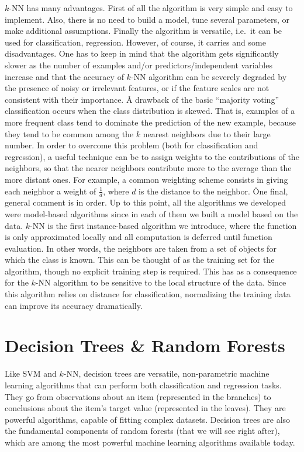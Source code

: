 
$k$-NN has many advantages. First of all the algorithm is very simple and easy to implement. Also, there is no need
to build a model, tune several parameters, or make additional assumptions. Finally the algorithm is versatile, i.e.\
it can be used for classification, regression. However, of course, it carries and some disadvantages. One has to
keep in mind that the algorithm gets significantly slower as the number of examples and/or predictors/independent
variables increase and that the accuracy of $k$-NN algorithm can be severely degraded by the presence of noisy or
irrelevant features, or if the feature scales are not consistent with their importance. \v

A drawback of the basic ``majority voting'' classification occurs when the class distribution is skewed. That is,
examples of a more frequent class tend to dominate the prediction of the new example, because they tend to be common
among the $k$ nearest neighbors due to their large number. In order to overcome this problem (both for classification
and regression), a useful technique can be to assign weights to the contributions of the neighbors, so that the
nearer neighbors contribute more to the average than the more distant ones. For example, a common weighting scheme
consists in giving each neighbor a weight of $\frac{1}{d}$, where $d$ is the distance to the neighbor. \v

One final, general comment is in order. Up to this point, all the algorithms we developed were model-based algorithms
since in each of them we built a model based on the data. $k$-NN is the first instance-based algorithm we introduce,
where the function is only approximated locally and all computation is deferred until function evaluation. In other
words, the neighbors are taken from a set of objects for which the class is known. This can be thought of as the
training set for the algorithm, though no explicit training step is required. This has as a consequence for the
$k$-NN algorithm to be sensitive to the local structure of the data. Since this algorithm relies on distance for
classification, normalizing the training data can improve its accuracy dramatically.

\section{Decision Trees \& Random Forests}

Like SVM and $k$-NN, decision trees are versatile, non-parametric machine learning algorithms that can perform both
classification and regression tasks. They go from observations about an item (represented in the branches) to
conclusions about the item's target value (represented in the leaves). They are powerful algorithms, capable of
fitting complex datasets. Decision trees are also the fundamental components of random forests (that we will see
right after), which are among the most powerful machine learning algorithms available today.

